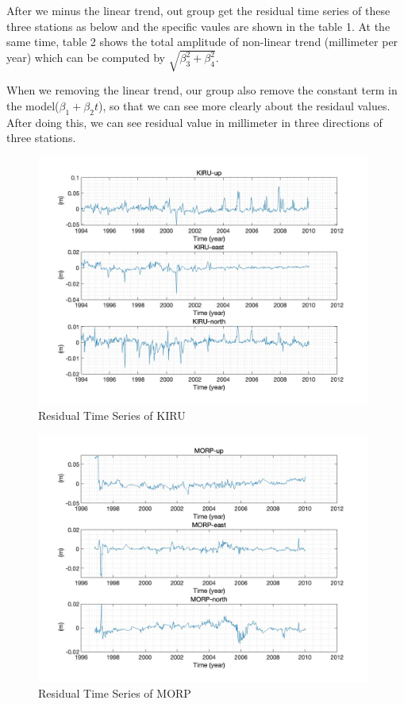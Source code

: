 \documentclass{article}
\begin{document}
After we minus the linear trend, out group get the residual time series of these three stations as below 
and the specific vaules are shown in the table 1. 
At the same time, table 2 shows the total amplitude of non-linear trend (millimeter per year) which can be computed by $\sqrt{\beta_3^2+\beta_4^2}$.

When we removing the linear trend, our group also remove the constant term in the model($\beta_1 + \beta_2 t$), 
so that we can see more clearly about the residaul values.
After doing this, we can see residual value in millimeter in three directions of three stations.
\begin{figure}[H]
  \centering
  \includegraphics[width=11cm]{../result/re_figure/fig_kiru/4.jpg}
  \captionsetup{skip=0.2cm}
  \caption{Residual Time Series of KIRU}
  \label{fig:Res_KIRU}
\end{figure}
\begin{figure}[H]
  \centering
  \includegraphics[width=11cm]{../result/re_figure/fig_MORP/4.jpg}
  \caption{Residual Time Series of MORP}
  \label{fig:Res_MORP}
\end{figure}
\end{document}
